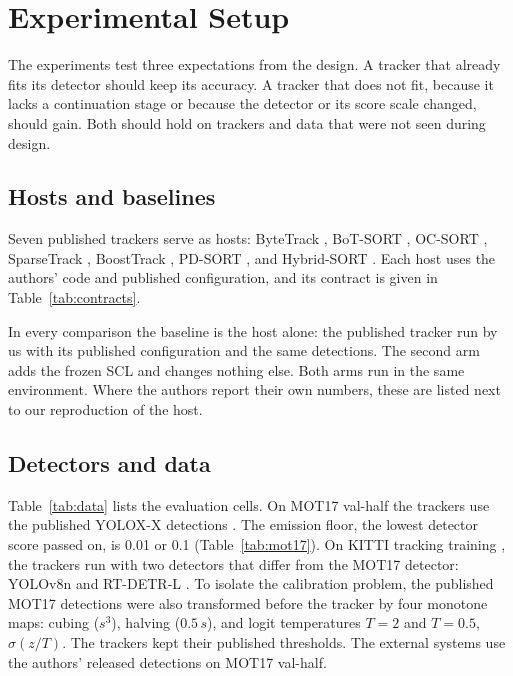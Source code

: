 \documentclass[pdflatex,sn-mathphys-num,iicol]{sn-jnl}
\newcommand{\scl}{SCL}
\begin{document}
\section{Experimental Setup}\label{sec:setup}

The experiments test three expectations from the design. A tracker that
already fits its detector should keep its accuracy. A tracker that does not
fit, because it lacks a continuation stage or because the detector or its
score scale changed, should gain. Both should hold on trackers and data that
were not seen during design.

\subsection{Hosts and baselines}\label{sec:hosts}
Seven published trackers serve as hosts: ByteTrack \cite{zhang2022bytetrack},
BoT-SORT \cite{aharon2022botsort}, OC-SORT \cite{cao2023ocsort}, SparseTrack
\cite{liu2025sparsetrack}, BoostTrack \cite{stanojevic2024boosttrack},
PD-SORT \cite{wang2025pdsort}, and Hybrid-SORT \cite{yang2024hybridsort}.
Each host uses the authors' code and published configuration,
and its contract is given in Table~\ref{tab:contracts}.

In every comparison the baseline is the host alone: the published tracker run
by us with its published configuration and the same detections. The second
arm adds the frozen \scl{} and changes nothing else. Both arms run in the same
environment. Where the authors report their own numbers, these are listed
next to our reproduction of the host.

\subsection{Detectors and data}\label{sec:data}
Table~\ref{tab:data} lists the evaluation cells. On MOT17 val-half
\cite{milan2016mot16} the trackers use the published YOLOX-X detections
\cite{ge2021yolox}. The emission floor, the lowest detector score passed on,
is 0.01 or 0.1 (Table~\ref{tab:mot17}). On KITTI tracking training \cite{geiger2012kitti}, the trackers run
with two detectors that differ from the MOT17 detector: YOLOv8n
\cite{jocher2023yolov8} and RT-DETR-L \cite{zhao2024rtdetr}. To isolate the
calibration problem, the published MOT17 detections were also transformed
before the tracker by four monotone maps: cubing ($s^3$), halving ($0.5\,s$),
and logit temperatures $T=2$ and $T=0.5$, $\sigma(z/T)$. The trackers kept
their published thresholds. The external systems use the authors' released
detections on MOT17 val-half.
\end{document}

